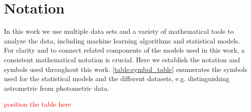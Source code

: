 \documentclass[twocolumn]{aastex631}
\newcommand{\TODO}[1]{{\textcolor{red}{#1}}}
\begin{document}
\appendix

\section{Notation} \label{app:notation}

    In this work we use multiple data sets and a variety of mathematical tools
    to analyze the data, including machine learning algorithms and statistical
    models.  For clarity and to connect related components of the models used in
    this work, a consistent mathematical notation is crucial. Here we establish
    the notation and symbols used throughout this work.
    \autoref{table:symbol_table} enumerates the symbols used for the statistical
    models and the different datasets, e.g. distinguishing astrometric from
    photometric data. 

    \TODO{position the table here}
\end{document}
